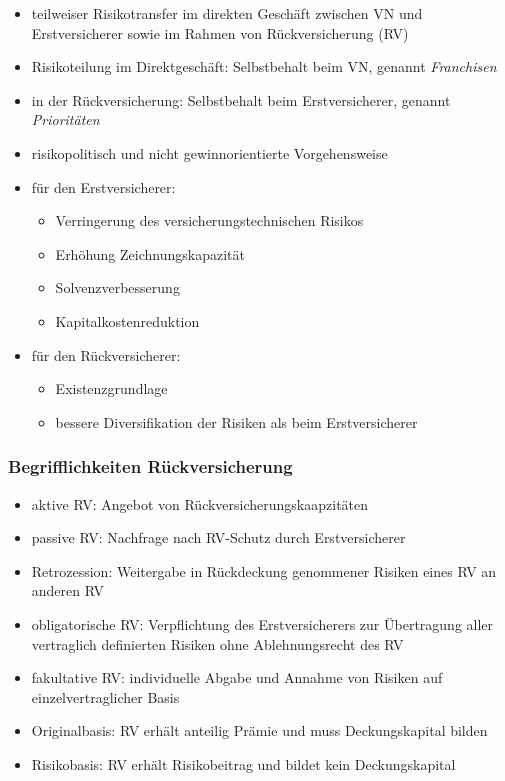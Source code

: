 \documentclass[12pt]{report}
\theoremstyle{dotless}
\theoremstyle{definition}
\begin{document}
\begin{itemize}
	\item teilweiser Risikotransfer im direkten Geschäft zwischen VN und Erstversicherer sowie im Rahmen von Rückversicherung (RV)
	\item Risikoteilung im Direktgeschäft: Selbstbehalt beim VN, genannt \textit{Franchisen}
	\item in der Rückversicherung: Selbstbehalt beim Erstversicherer, genannt \textit{Prioritäten}
	\item risikopolitisch und nicht gewinnorientierte Vorgehensweise
	\item für den Erstversicherer:
		\begin{itemize}
			\item Verringerung des versicherungstechnischen Risikos
			\item Erhöhung Zeichnungskapazität
			\item Solvenzverbesserung
			\item Kapitalkostenreduktion
		\end{itemize}
	\item für den Rückversicherer:
		\begin{itemize}
			\item Existenzgrundlage
			\item bessere Diversifikation der Risiken als beim Erstversicherer
		\end{itemize}
\end{itemize}

\subsubsection{Begrifflichkeiten Rückversicherung}
\begin{itemize}
	\item aktive RV: Angebot von Rückversicherungskaapzitäten
	\item passive RV: Nachfrage nach RV-Schutz durch Erstversicherer
	\item Retrozession: Weitergabe in Rückdeckung genommener Risiken eines RV an anderen RV
	\item obligatorische RV: Verpflichtung des Erstversicherers zur Übertragung aller vertraglich definierten Risiken ohne Ablehnungsrecht des RV
	\item fakultative RV: individuelle Abgabe und Annahme von Risiken auf einzelvertraglicher Basis
	\item Originalbasis: RV erhält anteilig Prämie und muss Deckungskapital bilden
	\item Risikobasis: RV erhält Risikobeitrag und bildet kein Deckungskapital
\end{itemize}
\end{document}
